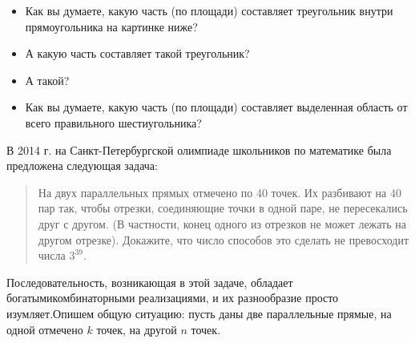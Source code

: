
\begin{itemize}
\item Как вы думаете, какую часть (по площади) составляет треугольник внутри прямоугольника на картинке ниже?

\begin{center}  \end{center}


\item А какую часть составляет такой треугольник?

\begin{center}  \end{center}

\item А такой?

\begin{center}  \end{center}

\item Как вы думаете, какую часть (по площади) составляет выделенная область от всего правильного шестиугольника?

\begin{center}  \end{center}

\end{itemize}



В 2014 г. на Санкт-Петербургской олимпиаде школьников по математике была предложена следующая задача:
\begin{quote}
На двух параллельных прямых отмечено по 40 точек. Их разбивают на 40 пар так, чтобы отрезки, соединяющие точки в одной паре, не пересекались друг с другом. (В частности, конец одного из отрезков не может лежать на другом отрезке). Докажите, что число способов это сделать не превосходит числа $3^{39}$.
\end{quote}
Последовательность, возникающая в этой задаче, обладает богатыми\linebreak комбинаторными реализациями, и их разнообразие просто изумляет.\linebreak Опишем общую ситуацию: пусть даны две параллельные прямые, на одной отмечено $k$ точек, на другой $n$ точек. 


